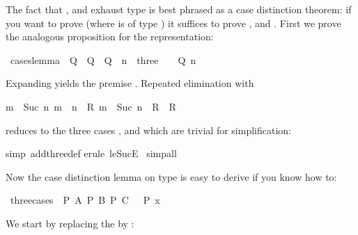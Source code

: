 \begin{isabellebody}
\begin{isamarkuptext}
The fact that ,  and  exhaust type  is
best phrased as a case distinction theorem: if you want to prove 
(where  is of type ) it suffices to prove ,
 and . First we prove the analogous proposition for the
representation:%
\end{isamarkuptext}%
\ cases{\isacharunderscore}lemma{\isacharcolon}\ {\isachardoublequote}{\isasymlbrakk}\ Q\ {}{\isacharsemicolon}\ Q\ {}{\isacharsemicolon}\ Q\ {}{\isacharsemicolon}\ n\ {\isacharcolon}\ three\ {\isasymrbrakk}\ {\isasymLongrightarrow}\ \ Q\ n{\isachardoublequote}%
\begin{isamarkuptxt}%
\noindent
Expanding  yields the premise . Repeated
elimination with 
\begin{isabelle}%
{\isasymlbrakk}{\isacharquery}m\ {\isasymle}\ Suc\ {\isacharquery}n{\isacharsemicolon}\ {\isacharquery}m\ {\isasymle}\ {\isacharquery}n\ {\isasymLongrightarrow}\ {\isacharquery}R{\isacharsemicolon}\ {\isacharquery}m\ {\isacharequal}\ Suc\ {\isacharquery}n\ {\isasymLongrightarrow}\ {\isacharquery}R{\isasymrbrakk}\ {\isasymLongrightarrow}\ {\isacharquery}R%
\end{isabelle}
reduces  to the three cases ,  and
 which are trivial for simplification:%
\end{isamarkuptxt}%
simp\ add{\isacharcolon}three{\isacharunderscore}def{\isacharparenright}\isanewline
{}erule\ le{\isacharunderscore}SucE{\isacharparenright}{\isacharplus}{\isacharparenright}\isanewline
{}\ simp{\isacharunderscore}all\isanewline
{}%
\begin{isamarkuptext}%
Now the case distinction lemma on type  is easy to derive if you know how to:%
\end{isamarkuptext}%
\ three{\isacharunderscore}cases{\isacharcolon}\ {\isachardoublequote}{\isasymlbrakk}\ P\ A{\isacharsemicolon}\ P\ B{\isacharsemicolon}\ P\ C\ {\isasymrbrakk}\ {\isasymLongrightarrow}\ P\ x{\isachardoublequote}%
\begin{isamarkuptxt}%
\noindent
We start by replacing the  by :%

\end{isamarkuptxt}
\end{isabellebody}
